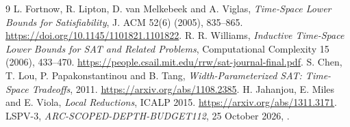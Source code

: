 \documentclass[11pt]{article}
\begin{document}
\begin{thebibliography}{9}
 L. Fortnow, R. Lipton, D. van Melkebeek and A. Viglas,
\emph{Time-Space Lower Bounds for Satisfiability}, J. ACM 52(6)
(2005), 835--865. \url{https://doi.org/10.1145/1101821.1101822}.
 R. R. Williams,
\emph{Inductive Time-Space Lower Bounds for SAT and Related Problems},
Computational Complexity 15 (2006), 433--470.
\url{https://people.csail.mit.edu/rrw/sat-journal-final.pdf}.
 S. Chen, T. Lou, P. Papakonstantinou and B. Tang,
\emph{Width-Parameterized SAT: Time-Space Tradeoffs}, 2011.
\url{https://arxiv.org/abs/1108.2385}.
 H. Jahanjou, E. Miles and E. Viola,
\emph{Local Reductions}, ICALP 2015.
\url{https://arxiv.org/abs/1311.3171}.
 LSPV-3,
\emph{ARC-SCOPED-DEPTH-BUDGET112}, 25 October 2026,
.
\end{thebibliography}
\end{document}
